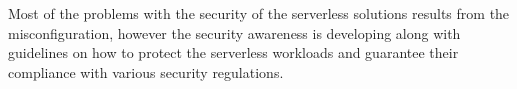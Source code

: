 Most of the problems with the security of the serverless solutions results from the misconfiguration, however the security awareness is developing along with guidelines on how to protect the serverless workloads and guarantee their compliance with various security regulations.







